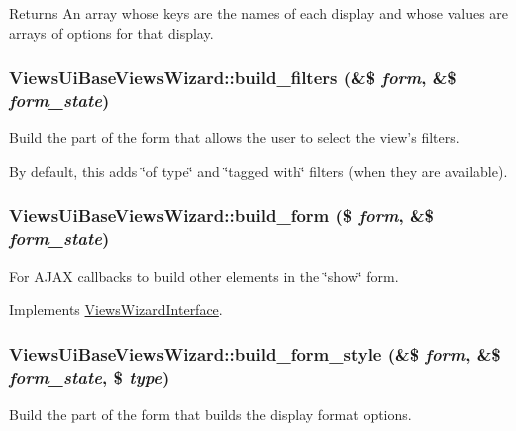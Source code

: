 \begin{DoxyReturn}{Returns}
An array whose keys are the names of each display and whose values are arrays of options for that display. 
\end{DoxyReturn}
\hypertarget{classViewsUiBaseViewsWizard_a796b382ac41d2b3cab1352fffac9a015}{
\subsubsection[{build\_\-filters}]{\setlength{\rightskip}{0pt plus 5cm}ViewsUiBaseViewsWizard::build\_\-filters (\&\$ {\em form}, \/  \&\$ {\em form\_\-state})}}
\label{classViewsUiBaseViewsWizard_a796b382ac41d2b3cab1352fffac9a015}
Build the part of the form that allows the user to select the view's filters.

By default, this adds \char`\"{}of type\char`\"{} and \char`\"{}tagged with\char`\"{} filters (when they are available). \hypertarget{classViewsUiBaseViewsWizard_aca015cf9fee6dd3ee556b18405f4dfe4}{
\subsubsection[{build\_\-form}]{\setlength{\rightskip}{0pt plus 5cm}ViewsUiBaseViewsWizard::build\_\-form (\$ {\em form}, \/  \&\$ {\em form\_\-state})}}
\label{classViewsUiBaseViewsWizard_aca015cf9fee6dd3ee556b18405f4dfe4}
For AJAX callbacks to build other elements in the \char`\"{}show\char`\"{} form. 

Implements \hyperlink{interfaceViewsWizardInterface_a9ae787c3f3e1d59fb1850c491ff24bcb}{ViewsWizardInterface}.\hypertarget{classViewsUiBaseViewsWizard_ac467f4635ccfcf169406f8c90c4e985c}{
\subsubsection[{build\_\-form\_\-style}]{\setlength{\rightskip}{0pt plus 5cm}ViewsUiBaseViewsWizard::build\_\-form\_\-style (\&\$ {\em form}, \/  \&\$ {\em form\_\-state}, \/  \$ {\em type})}}
\label{classViewsUiBaseViewsWizard_ac467f4635ccfcf169406f8c90c4e985c}
Build the part of the form that builds the display format options. 

